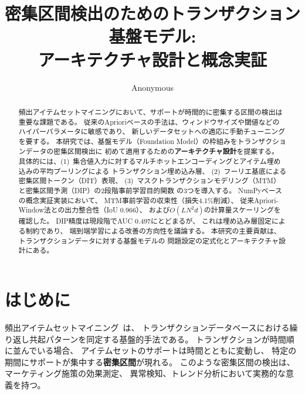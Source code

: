 \documentclass[sigconf,nonacm]{acmart}
\begin{document}
\title{密集区間検出のためのトランザクション基盤モデル:\\アーキテクチャ設計と概念実証}

\author{Anonymous}

\begin{abstract}
頻出アイテムセットマイニングにおいて、サポートが時間的に密集する区間の検出は重要な課題である。
従来のAprioriベースの手法は、ウィンドウサイズや閾値などのハイパーパラメータに敏感であり、
新しいデータセットへの適応に手動チューニングを要する。
本研究では、基盤モデル（Foundation Model）の枠組みをトランザクションデータの密集区間検出に
初めて適用するための\textbf{アーキテクチャ設計}を提案する。
具体的には、(1)~集合値入力に対するマルチホットエンコーディングとアイテム埋め込みの平均プーリングによる
トランザクション埋め込み層、
(2)~フーリエ基底による密集区間トークン（DIT）表現、
(3)~マスクトランザクションモデリング（MTM）と密集区間予測（DIP）の2段階事前学習目的関数
の3つを導入する。
NumPyベースの概念実証実装において、
MTM事前学習の収束性（損失4.1\%削減）、
従来Apriori-Window法との出力整合性（IoU 0.966）、
および$O(LN^2d)$の計算量スケーリングを確認した。
DIP精度は現段階でAUC 0.497にとどまるが、
これは埋め込み層固定による制約であり、
端到端学習による改善の方向性を議論する。
本研究の主要貢献は、トランザクションデータに対する基盤モデルの
問題設定の定式化とアーキテクチャ設計にある。
\end{abstract}


\maketitle

\section{はじめに}
\label{sec:introduction}

頻出アイテムセットマイニング~\cite{agrawal1994fast,han2004mining}は、
トランザクションデータベースにおける繰り返し共起パターンを同定する基盤的手法である。
トランザクションが時間順に並んでいる場合、
アイテムセットのサポートは時間とともに変動し、
特定の期間にサポートが集中する\textbf{密集区間}が現れる。
このような密集区間の検出は、マーケティング施策の効果測定、
異常検知、トレンド分析において実務的な意義を持つ。
\end{document}
